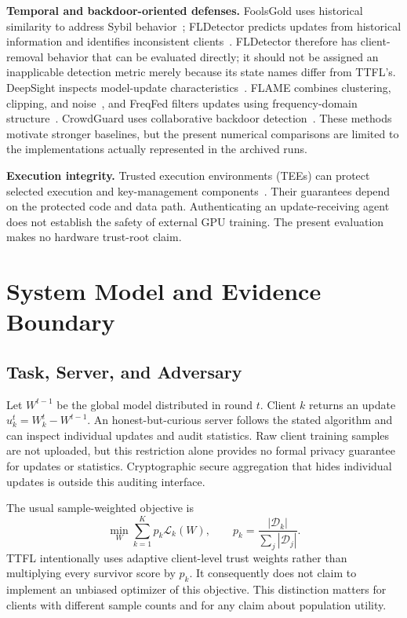 \documentclass[conference,compsoc]{IEEEtran}
\begin{document}
\textbf{Temporal and backdoor-oriented defenses.}
FoolsGold uses historical similarity to address Sybil behavior~\cite{fung2020foolsgold}; FLDetector predicts updates from historical information and identifies inconsistent clients~\cite{fldetector2022}. FLDetector therefore has client-removal behavior that can be evaluated directly; it should not be assigned an inapplicable detection metric merely because its state names differ from TTFL's. DeepSight inspects model-update characteristics~\cite{deepsight2022}. FLAME combines clustering, clipping, and noise~\cite{flame2022}, and FreqFed filters updates using frequency-domain structure~\cite{freqfed2024}. CrowdGuard uses collaborative backdoor detection~\cite{crowdguard2024}. These methods motivate stronger baselines, but the present numerical comparisons are limited to the implementations actually represented in the archived runs.

\textbf{Execution integrity.}
Trusted execution environments (TEEs) can protect selected execution and key-management components~\cite{r1_tee_integrity,xu2021distributed,r5_tee_mitigating}. Their guarantees depend on the protected code and data path. Authenticating an update-receiving agent does not establish the safety of external GPU training. The present evaluation makes no hardware trust-root claim.

\section{System Model and Evidence Boundary}
\subsection{Task, Server, and Adversary}
Let $W^{t-1}$ be the global model distributed in round $t$. Client $k$ returns an update $u_k^t=W_k^t-W^{t-1}$. An honest-but-curious server follows the stated algorithm and can inspect individual updates and audit statistics. Raw client training samples are not uploaded, but this restriction alone provides no formal privacy guarantee for updates or statistics. Cryptographic secure aggregation that hides individual updates is outside this auditing interface.

The usual sample-weighted objective is
\begin{equation}
 \min_W\sum_{k=1}^{K}p_k\mathcal L_k(W),\qquad
 p_k=\frac{|\mathcal D_k|}{\sum_j|\mathcal D_j|}.
\end{equation}
TTFL intentionally uses adaptive client-level trust weights rather than multiplying every survivor score by $p_k$. It consequently does not claim to implement an unbiased optimizer of this objective. This distinction matters for clients with different sample counts and for any claim about population utility.
\end{document}
